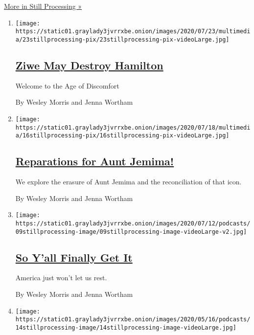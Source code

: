 \href{/column/still-processing-podcast}{More in Still Processing »}

\begin{enumerate}
\def\labelenumi{\arabic{enumi}.}
\item
  \texttt{[image: https://static01.graylady3jvrrxbe.onion/images/2020/07/23/multimedia/23stillprocessing-pix/23stillprocessing-pix-videoLarge.jpg]}

  \hypertarget{ziwe-may-destroy-hamilton}{%
  \subsection{\texorpdfstring{\href{/2020/07/23/podcasts/hamilton-ziwe-discomfort.html}{Ziwe
  May Destroy
  Hamilton}}{Ziwe May Destroy Hamilton}}\label{ziwe-may-destroy-hamilton}}

  Welcome to the Age of Discomfort

  By Wesley Morris and Jenna Wortham
\item
  \texttt{[image: https://static01.graylady3jvrrxbe.onion/images/2020/07/18/multimedia/16stillprocessing-pix/16stillprocessing-pix-videoLarge.jpg]}

  \hypertarget{reparations-for-aunt-jemima}{%
  \subsection{\texorpdfstring{\href{/2020/07/16/podcasts/reparations-for-aunt-jemima.html}{Reparations
  for Aunt
  Jemima!}}{Reparations for Aunt Jemima!}}\label{reparations-for-aunt-jemima}}

  We explore the erasure of Aunt Jemima and the reconciliation of that
  icon.

  By Wesley Morris and Jenna Wortham
\item
  \texttt{[image: https://static01.graylady3jvrrxbe.onion/images/2020/07/12/podcasts/09stillprocessing-image/09stillprocessing-image-videoLarge-v2.jpg]}

  \hypertarget{so-yall-finally-get-it}{%
  \subsection{\texorpdfstring{\href{/2020/07/09/podcasts/still-processing-black-lives-matter.html}{So
  Y'all Finally Get
  It}}{So Y'all Finally Get It}}\label{so-yall-finally-get-it}}

  America just won't let us rest.

  By Wesley Morris and Jenna Wortham
\item
  \texttt{[image: https://static01.graylady3jvrrxbe.onion/images/2020/05/16/podcasts/14stillprocessing-image/14stillprocessing-image-videoLarge.jpg]}


\end{enumerate}
